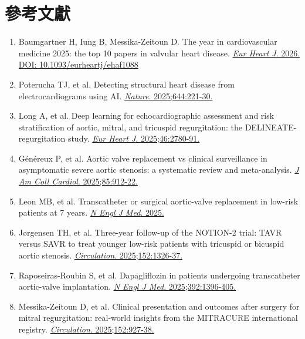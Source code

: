 \documentclass[12pt,a4paper]{article}
\begin{document}
\section{參考文獻}

\begin{enumerate}
    \item Baumgartner H, Iung B, Messika-Zeitoun D. The year in cardiovascular medicine 2025: the top 10 papers in valvular heart disease. \href{https://doi.org/10.1093/eurheartj/ehaf1088}{\textit{Eur Heart J}. 2026. DOI: 10.1093/eurheartj/ehaf1088}

    \item Poterucha TJ, et al. Detecting structural heart disease from electrocardiograms using AI. \href{https://doi.org/10.1038/s41586-025-09227-0}{\textit{Nature}. 2025;644:221-30.}

    \item Long A, et al. Deep learning for echocardiographic assessment and risk stratification of aortic, mitral, and tricuspid regurgitation: the DELINEATE-regurgitation study. \href{https://doi.org/10.1093/eurheartj/ehaf248}{\textit{Eur Heart J}. 2025;46:2780-91.}

    \item Généreux P, et al. Aortic valve replacement vs clinical surveillance in asymptomatic severe aortic stenosis: a systematic review and meta-analysis. \href{https://doi.org/10.1016/j.jacc.2024.11.006}{\textit{J Am Coll Cardiol}. 2025;85:912-22.}

    \item Leon MB, et al. Transcatheter or surgical aortic-valve replacement in low-risk patients at 7 years. \href{https://doi.org/10.1056/NEJMoa2509766}{\textit{N Engl J Med}. 2025.}

    \item Jørgensen TH, et al. Three-year follow-up of the NOTION-2 trial: TAVR versus SAVR to treat younger low-risk patients with tricuspid or bicuspid aortic stenosis. \href{https://doi.org/10.1161/CIRCULATIONAHA.125.076678}{\textit{Circulation}. 2025;152:1326-37.}

    \item Raposeiras-Roubin S, et al. Dapagliflozin in patients undergoing transcatheter aortic-valve implantation. \href{https://doi.org/10.1056/NEJMoa2500366}{\textit{N Engl J Med}. 2025;392:1396-405.}

    \item Messika-Zeitoun D, et al. Clinical presentation and outcomes after surgery for mitral regurgitation: real-world insights from the MITRACURE international registry. \href{https://doi.org/10.1161/CIRCULATIONAHA.124.073674}{\textit{Circulation}. 2025;152:927-38.}


\end{enumerate}
\end{document}
